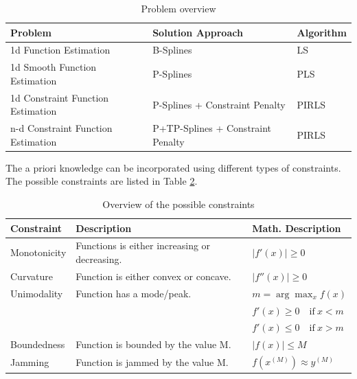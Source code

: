 \documentclass[10pt,a4paper]{report}
\begin{document}
\begin{table}[H]
	\centering
	\begin{tabular}{|lll|}
		\hline
		\textbf{Problem}                   & \textbf{Solution Approach}           & \textbf{Algorithm}  \\ \hline \toprule
		1d Function Estimation             & B-Splines                            & LS                  \\ \hline
		1d Smooth Function Estimation      & P-Splines                            & PLS                 \\ \hline
		1d Constraint Function Estimation  & P-Splines + Constraint Penalty       & PIRLS 			    \\ \hline 
		n-d Constraint Function Estimation & P+TP-Splines + Constraint Penalty & PIRLS 			    \\ \hline \bottomrule
	\end{tabular}
	\caption{Problem overview}
	\label{tab:problem_overview}
\end{table}

The a priori knowledge can be incorporated using different types of constraints. The possible constraints are listed in Table \ref{tab:constraint_overview}.

\begin{table}[h]
	\centering
	\begin{tabular}{|lll|}
		\hline
		\textbf{Constraint}& \textbf{Description}                         & \textbf{Math. Description}\\ \hline \toprule
		Monotonicity       & Functions is either increasing or decreasing.& $\lvert f'(x) \rvert \ge 0$ 	\\ \hline
		Curvature          & Function is either convex or concave.        & $\lvert f''(x) \rvert \ge 0$ 	\\ \hline
		Unimodality        & Function has a mode/peak.                    & $m = \arg \max_{x} f(x)$ 				\\ 
		&	   										  & $f'(x) \ge 0 \quad \text{if} \ x < m$  \\ 
		&  											  & $f'(x) \le 0 \quad \text{if} \ x > m$  \\ \hline
		Boundedness        & Function is bounded by the value M.          & $\lvert f(x)\rvert \le M$ 		\\ \hline
		Jamming            & Function is jammed by the value M.           & $f(x^{(M)}) \approx y^{(M)}$	\\ \hline \bottomrule
	\end{tabular}
	\caption{Overview of the possible constraints}
	\label{tab:constraint_overview}
\end{table}
\end{document}
